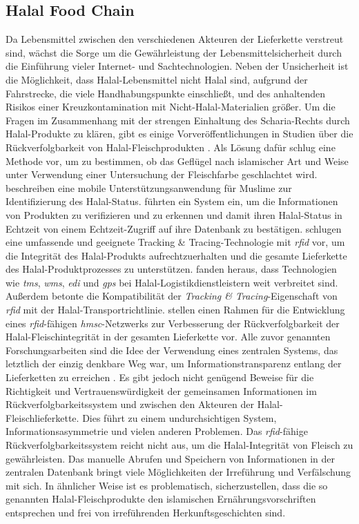 \subsection{Halal Food Chain}
Da Lebensmittel zwischen den verschiedenen Akteuren der Lieferkette verstreut sind, wächst die Sorge um die Gewährleistung der Lebensmittelsicherheit durch die Einführung vieler Internet- und Sachtechnologien. Neben der Unsicherheit ist die Möglichkeit, dass Halal-Lebensmittel nicht Halal sind, aufgrund der Fahrstrecke, die viele Handhabungspunkte einschließt, und des anhaltenden Risikos einer Kreuzkontamination mit Nicht-Halal-Materialien größer. Um die Fragen im Zusammenhang mit der strengen Einhaltung des Scharia-Rechts durch Halal-Produkte zu klären, gibt es einige Vorveröffentlichungen in Studien über die Rückverfolgbarkeit von Halal-Fleischprodukten \citep{Mohammed2016}. Als Lösung dafür schlug \citet{Mohamad2016} eine Methode vor, um zu bestimmen, ob das Geflügel nach islamischer Art und Weise unter Verwendung einer Untersuchung der Fleischfarbe geschlachtet wird. \citet{Junaini2008} beschreiben eine mobile Unterstützungsanwendung für Muslime zur Identifizierung des Halal-Status. \citet{Kassim2012} führten ein System ein, um die Informationen von Produkten zu verifizieren und zu erkennen und damit ihren Halal-Status in Echtzeit von einem Echtzeit-Zugriff auf ihre Datenbank zu bestätigen. \citet{SitiSarahMohdBahrudin2011} schlugen eine umfassende und geeignete Tracking \& Tracing-Technologie mit \textit{\ac{rfid}} vor, um die Integrität des Halal-Produkts aufrechtzuerhalten und die gesamte Lieferkette des Halal-Produktprozesses zu unterstützen. \citet{Tan2012} fanden heraus, dass Technologien wie \textit{\ac{tms}}, \textit{\ac{wms}}, \textit{\ac{edi}} und \textit{\ac{gps}} bei Halal-Logistikdienstleistern weit verbreitet sind. Außerdem betonte \citet{Tan2012} die Kompatibilität der \textit{Tracking \& Tracing}-Eigenschaft von \textit{\ac{rfid}} mit der Halal-Transportrichtlinie. \citet{Mohammed2016} stellen einen Rahmen für die Entwicklung eines \textit{\ac{rfid}}-fähigen \textit{\ac{hmsc}}-Netzwerks zur Verbesserung der Rückverfolgbarkeit der Halal-Fleischintegrität in der gesamten Lieferkette vor. Alle zuvor genannten Forschungsarbeiten sind die Idee der Verwendung eines zentralen Systems, das letztlich der einzig denkbare Weg war, um Informationstransparenz entlang der Lieferketten zu erreichen \citep{Tian2017}. Es gibt jedoch nicht genügend Beweise für die Richtigkeit und Vertrauenswürdigkeit der gemeinsamen Informationen im Rückverfolgbarkeitssystem und zwischen den Akteuren der Halal-Fleischlieferkette. Dies führt zu einem undurchsichtigen System, Informationsasymmetrie und vielen anderen Problemen. Das \textit{\ac{rfid}}-fähige Rückverfolgbarkeitssystem reicht nicht aus, um die Halal-Integrität von Fleisch zu gewährleisten. Das manuelle Abrufen und Speichern von Informationen in der zentralen Datenbank bringt viele Möglichkeiten der Irreführung und Verfälschung mit sich. In ähnlicher Weise ist es problematisch, sicherzustellen, dass die so genannten Halal-Fleischprodukte den islamischen Ernährungsvorschriften entsprechen und frei von irreführenden Herkunftsgeschichten sind.

\newpage
